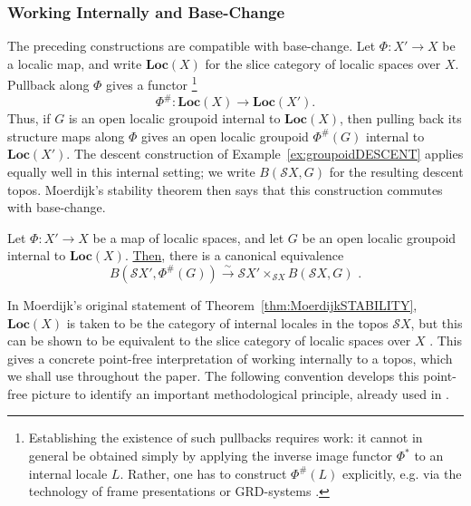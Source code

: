 \documentclass[a4paper, 11pt,reqno]{amsart}
\newcommand{\baseS}{\mathcal{S}}
\begin{document}
\subsubsection{Working Internally and Base-Change} The preceding constructions are compatible with base-change. Let $\Phi\colon X'\to X$ be a localic map, and write $\mathbf{Loc}(X)$ for the slice category of localic spaces over $X$. Pullback along $\Phi$ gives a functor \footnote{Establishing the existence of such pullbacks requires work: it cannot in general be obtained simply by applying the inverse image functor $\Phi^*$ to an internal locale $L$. Rather, one has to construct $\Phi^{\#}(L)$ explicitly, e.g. via the technology of frame presentations \cite[\S 1.6]{Moerdijk} or GRD-systems \cite[\S 5]{ViPowerlocaleEXP}.}  
$$\Phi^{\#}\colon\mathbf{Loc}(X)\longrightarrow\mathbf{Loc}(X').$$
Thus, if $G$ is an open localic groupoid internal to $\mathbf{Loc}(X)$, then pulling back its structure maps along $\Phi$ gives an open localic groupoid
 $\Phi^\#(G)$ internal to $\mathbf{Loc}(X')$. The descent construction of Example~\ref{ex:groupoidDESCENT} applies equally well in this internal setting; we write $B(\baseS X,G)$ for the resulting descent topos. Moerdijk's stability theorem then says that this construction commutes with base-change.%

\begin{theorem}\label{thm:MoerdijkSTABILITY} Let $\Phi\colon X'\to X$ be a map of localic spaces, and let $G$ be an open localic groupoid internal to $\mathbf{Loc}(X)$. \underline{Then}, there is a canonical equivalence
	\[B(\baseS X',\Phi^{\#}(G))\xrightarrow{\sim} \baseS X'\times_{\baseS X} B(\baseS X,G)\,\,.\]
\end{theorem}


In Moerdijk's original statement of Theorem~\ref{thm:MoerdijkSTABILITY}, $\mathbf{Loc}(X)$ is taken to be the category of internal locales in the topos $\baseS X$, but this can be shown to be equivalent to the slice category of localic spaces over $X$ \cite[C1.6]{Elephant}. This gives a concrete point-free interpretation of working internally to a topos, which we shall use throughout the paper. The following convention develops this point-free picture to identify an important methodological principle, already used in \cite{NV}.
\end{document}
